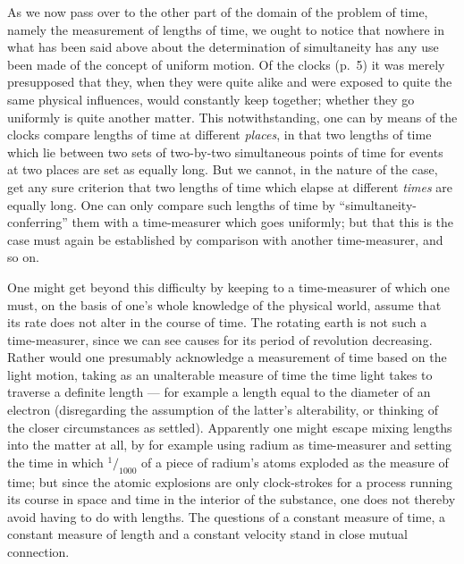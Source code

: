 \documentclass[12pt,a4paper]{article}
\begin{document}
As we now pass over to the other part of the domain of the problem of time,
namely the measurement of lengths of time, we ought to notice that nowhere in
what has been said above about the determination of simultaneity has any use
been made of the concept of uniform motion. Of the clocks (p.~5) it was merely
presupposed that they, when they were quite alike and were exposed to quite
the same physical influences, would constantly keep together; whether they go
uniformly is quite another matter. This notwithstanding, one can by means of
the clocks compare lengths of time at different \emph{places}, in that two
lengths of time which lie between two sets of two-by-two
simultaneous points of time for events at two places are set as equally long.
But we cannot, in the nature of the case, get any sure criterion that two
lengths of time which elapse at different \emph{times} are equally long. One
can only compare such lengths of time by ``simultaneity-conferring'' them with
a time-measurer which goes uniformly; but that this is the case must again be
established by comparison with another time-measurer, and so on.

One might get beyond this difficulty by keeping to a time-measurer of which
one must, on the basis of one's whole knowledge of the physical world, assume
that its rate does not alter in the course of time. The rotating earth is not
such a time-measurer, since we can see causes for its period of revolution
decreasing. Rather would one presumably acknowledge a measurement of time
based on the light motion, taking as an unalterable measure of time the time
light takes to traverse a definite length --- for example a length equal to
the diameter of an electron (disregarding the assumption of the latter's
alterability, or thinking of the closer circumstances as settled). Apparently
one might escape mixing lengths into the matter at all, by for example using
radium as time-measurer and setting the time in which $^{1}\!/_{1000}$ of a
piece of radium's atoms exploded as the measure of time; but since the atomic
explosions are only clock-strokes for a process running its course in space
and time in the interior of the substance, one does not thereby avoid having
to do with lengths. The questions of a constant measure of time, a constant
measure of length and a constant velocity stand in close mutual connection.
\end{document}
